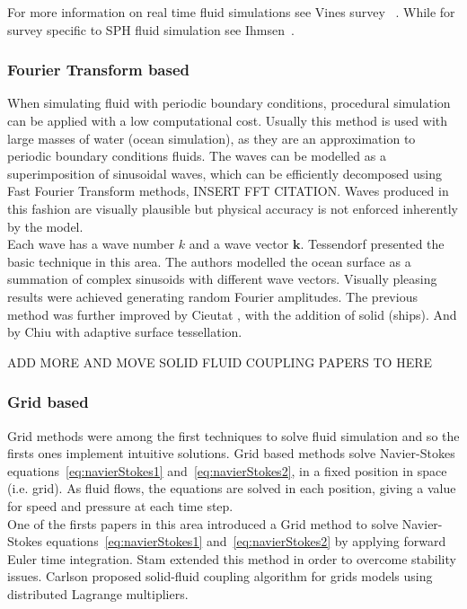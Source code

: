 \documentclass[11pt]{report}
\begin{document}
For more information on real time fluid simulations see Vines survey ~\cite{Vines2012}.
While for survey specific to SPH fluid simulation see Ihmsen~\cite{Ihmsen2014}.

\subsubsection{Fourier Transform based}

When simulating fluid with periodic boundary conditions, procedural simulation can be applied with a low computational cost.
Usually this method is used with large masses of water (ocean simulation), as they are an approximation to periodic boundary conditions fluids.
The waves can be modelled as a superimposition of sinusoidal waves, which can be efficiently decomposed using Fast Fourier Transform methods, INSERT FFT CITATION.
Waves produced in this fashion are visually plausible but physical accuracy is not enforced inherently by the model.\\

Each wave has a wave number $k$ and a wave vector $\mathbf{k}$.
Tessendorf \cite{Tessendorf2001} presented the basic technique in this area.
The authors modelled the ocean surface as a summation of complex sinusoids with different wave vectors.
Visually pleasing results were achieved generating random Fourier amplitudes.
The previous method was further improved by Cieutat \cite{Cieutat2003}, with the addition of solid (ships).
And by Chiu \cite{Chiu2006} with adaptive surface tessellation.


ADD MORE AND MOVE SOLID FLUID COUPLING PAPERS TO HERE

\subsubsection{Grid based}

Grid methods were among the first techniques to solve fluid simulation and so the firsts ones implement intuitive solutions.
Grid based methods solve Navier-Stokes equations~\ref{eq:navierStokes1} and~\ref{eq:navierStokes2}, in a fixed position in space (i.e. grid).
As fluid flows, the equations are solved in each position, giving a value for speed and pressure at each time step.\\

One of the firsts papers in this area introduced a Grid method \cite{Foster1996} to solve Navier-Stokes equations~\ref{eq:navierStokes1} and~\ref{eq:navierStokes2} by applying forward Euler time integration. 
Stam \cite{Stam1999} extended this method in order to overcome stability issues.
Carlson \cite{Carlson2004} proposed solid-fluid coupling algorithm for grids models using distributed Lagrange multipliers.
\end{document}
